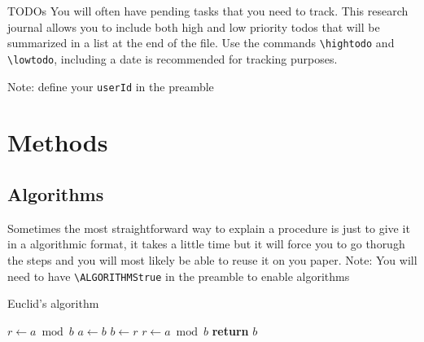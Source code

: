 \documentclass{project-logbook}
\begin{document}
{\begin{tipt}{TODOs}
You will often have pending tasks that you need to track. This research journal allows you to include both high and low priority todos that will be summarized in a list at the end of the file. Use the commands \texttt{\textbackslash hightodo} and \texttt{\textbackslash lowtodo}, including a date is recommended for tracking purposes.

Note: define your \texttt{userId} in the preamble
\end{tipt}





\newpage
\section{Methods} %
\label{sec:methods}

\subsection{Algorithms} %
\label{sub:algorithms}

\begin{tip}
Sometimes the most straightforward way to explain a procedure is just to give it in a algorithmic format, it takes a little time but it will force you to go thorugh the steps and you will most likely be able to reuse it on you paper.
Note: You will need to have \texttt{\textbackslash ALGORITHMStrue} in the preamble to enable algorithms
\end{tip}

\begin{algorithm}
\caption{Euclid’s algorithm}\label{alg:euclid}
\begin{algorithmic}[1]
\State $r\gets a\bmod b$
\State $a\gets b$
\State $b\gets r$
\State $r\gets a\bmod b$
\EndWhile\label{euclidendwhile}
\State \textbf{return} $b$
\EndProcedure
\end{algorithmic}
\end{algorithm}


}
\end{document}
